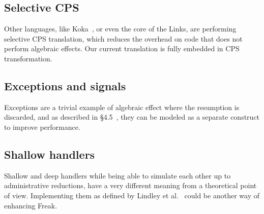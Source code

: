 \documentclass[declaration,shortabstract]{iithesis}
\theoremstyle{definition} \newtheorem{definition}{Definition}[chapter]
\theoremstyle{remark} \newtheorem{remark}[definition]{Observation}
\theoremstyle{plain} \newtheorem{theorem}[definition]{Theorem}
\theoremstyle{plain} \newtheorem{lemma}[definition]{Lemma}
\begin{document}
    \subsection{Selective CPS}

    Other languages, like Koka~\cite{leijen-koka}, or even the core of the Links,
    are performing selective CPS translation, which reduces the overhead on code
    that does not perform algebraic effects. Our current translation is fully
    embedded in CPS transformation.

    \subsection{Exceptions and signals}

    Exceptions are a trivial example of algebraic effect where the resumption is
    discarded, and as described in \S 4.5~\cite{handlers-cps}, they can be modeled
    as a separate construct to improve performance.

    \subsection{Shallow handlers}

    Shallow and deep handlers while being able to simulate each other up to
    administrative reductions, have a very different meaning from a theoretical point
    of view. Implementing them as defined by Lindley et al.~\cite{shallow-handlers}
    could be another way of enhancing Freak.



\printbibliography{}
\end{document}
